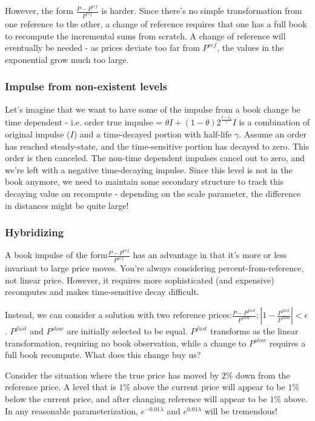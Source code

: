 \documentclass[]{article}
\begin{document}
	However, the form $\frac{P - P^{ref}}{{P^{ref}}}$ is harder. Since there's no simple transformation from one reference to the other, a change of reference requires that one has a full book to recompute the incremental sums from scratch. A change of reference will eventually be needed - as prices deviate too far from $P^{ref}$, the values in the exponential grow much too large.
	
	\subsubsection{Impulse from non-existent levels}
	
	Let's imagine that we want to have some of the impulse from a book change be time dependent - i.e. order true impulse = $\theta I + (1 - \theta)2^{\frac{t - t_I}{\gamma}}I $ is a combination of original impulse ($I$) and a time-decayed portion with half-life $\gamma$. Assume an order has reached steady-state, and the time-sensitive portion has decayed to zero. This order is then canceled. The non-time dependent impulses cancel out to zero, and we're left with a negative time-decaying impulse. Since this level is not in the book anymore, we need to maintain some secondary structure to track this decaying value on recompute - depending on the scale parameter, the difference in distances might be quite large!
	
	\subsubsection{Hybridizing}
	
	A book impulse of the form$\frac{P - P^{ref}}{{P^{ref}}}$ has an advantage in that it's more or less invariant to large price moves. You're always considering percent-from-reference, not linear price. However, it requires more sophisticated (and expensive) recomputes and makes time-sensitive decay difficult.
	
	Instead, we can consider a solution with two reference prices:$\frac{P - P^{fast}}{{P^{slow}}}; |1 - \frac{P^{fast}}{P^{slow}}| < \epsilon$. $P^{fast}$ and $P^{slow}$ are initially selected to be equal. $P^{fast}$ transforms as the linear transformation, requiring no book observation, while a change to $P^{slow}$ requires a full book recompute. What does this change buy us?
	
	Consider the situation where the true price has moved by $2\%$ down from the reference price. A level that is $1\%$ above the current price will appear to be $1\%$ below the current price, and after changing reference will appear to be $1\%$ above. In any reasonable parameterization, $e^{-0.01\lambda}$ and $e^{0.01\lambda}$ will be tremendous!
	
\end{document}
